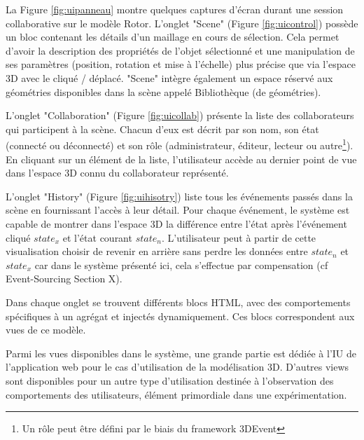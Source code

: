La Figure \ref{fig:uipanneau} montre quelques captures d'écran durant une 
session collaborative sur le modèle Rotor. L'onglet "Scene" (Figure 
\ref{fig:uicontrol}) possède un bloc contenant les détails 
d'un 
maillage en cours de 
sélection. Cela permet d'avoir la description des propriétés de l'objet sélectionné et 
une manipulation de ses paramètres (position, rotation et mise à l'échelle) plus 
précise que via l'espace \gls{3D} avec le cliqué / déplacé. "Scene" intègre 
également un espace réservé aux géométries disponibles dans la scène appelé 
Bibliothèque (de géométries).

L'onglet "Collaboration" (Figure \ref{fig:uicollab}) présente la liste des 
collaborateurs qui 
participent à la 
scène. Chacun d'eux est décrit par son nom, son état  (connecté ou déconnecté) 
et son rôle (administrateur, éditeur, lecteur ou autre\footnote{Un rôle peut être 
	défini par le biais du \gls{framework} 3DEvent}). En cliquant sur un élément de 
	la 
liste, l'utilisateur accède au dernier point de vue dans l'espace \gls{3D} connu du 
collaborateur représenté.

L'onglet "History" (Figure \ref{fig:uihisotry}) liste tous les événements passés dans 
la 
scène en fournissant 
l'accès à leur détail. Pour chaque événement, le système est capable de montrer 
dans l'espace \gls{3D} la différence entre l'état  après l'événement cliqué $state_x$ 
et l'état courant $state_n$. L'utilisateur peut à partir de cette visualisation choisir 
de \og revenir en arrière\fg{} sans perdre les données entre $state_n$ et $state_x$ 
car dans le système présenté ici, cela s'effectue par compensation (cf 
Event-Sourcing 
Section X).

Dans chaque onglet se trouvent différents blocs \gls{HTML}, avec des 
comportements spécifiques à un agrégat et injectés dynamiquement. Ces blocs 
correspondent aux vues de ce modèle.

Parmi les vues disponibles dans le système, une grande partie est dédiée à 
l'\gls{IU} de l'application web pour le cas d'utilisation de la modélisation 3D. 
D'autres views sont disponibles pour un autre type d'utilisation destinée à 
l'observation des comportements des utilisateurs, élément primordiale dans 
une expérimentation.



